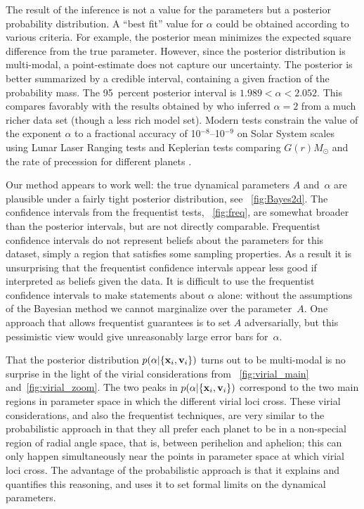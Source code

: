 The result of the inference is not a value for the parameters but a
posterior probability distribution.  A ``best fit'' value for $\alpha$
could be obtained according to various criteria. For example, the
posterior mean minimizes the expected square difference from the true
parameter. However, since the posterior distribution is multi-modal, a
point-estimate does not capture our uncertainty.  The posterior is
better summarized by a credible interval, containing a given fraction
of the probability mass. The 95~percent posterior interval is $1.989 <
\alpha < 2.052$. This compares favorably with the results obtained by
\citet{Newton} who inferred $\alpha = 2$ from a much richer data set
(though a less rich model set). Modern tests constrain the value of
the exponent $\alpha$ to a fractional accuracy of 10$^{-8}$--10$^{-9}$
on Solar System scales \citep{adelberger,fischbach} using Lunar Laser
Ranging tests \citep{williams} and Keplerian tests comparing $G(r)
M_{\odot}$ and the rate of precession for different planets
\citep{talmadge}.

Our method appears to work well: the true dynamical parameters $A$
and~$\alpha$ are plausible under a fairly tight posterior
distribution, see \figurename~\ref{fig:Bayes2d}. The confidence
intervals from the frequentist tests, \figurename~\ref{fig:freq}, are
somewhat broader than the posterior intervals, but are not directly
comparable. Frequentist confidence intervals do not represent beliefs
about the parameters for this dataset, simply a region that satisfies
some sampling properties. As a result it is unsurprising that the
frequentist confidence intervals appear less good if interpreted as
beliefs given the data. It is difficult to use the frequentist
confidence intervals to make statements about $\alpha$ alone: without
the assumptions of the Bayesian method we cannot marginalize over the
parameter~$A$. One approach that allows frequentist guarantees is to
set $A$ adversarially, but this pessimistic view would give
unreasonably large error bars for~$\alpha$.

That the posterior distribution $p(\alpha|\{\boldsymbol{\mathbf{x}}_i,\boldsymbol{\mathbf{v}}_i\})$ turns out to be
multi-modal is no surprise in the light of the virial considerations
from \figurenames~\ref{fig:virial_main} and~\ref{fig:virial_zoom}. The
two peaks in $p(\alpha|\{\boldsymbol{\mathbf{x}}_i,\boldsymbol{\mathbf{v}}_i\})$ correspond to the two main
regions in parameter space in which the different virial loci
cross. These virial considerations, and also the frequentist
techniques, are very similar to the probabilistic approach in that
they all prefer each planet to be in a non-special region of radial
angle space, that is, between perihelion and aphelion; this can only
happen simultaneously near the points in parameter space at which
virial loci cross.  The advantage of the probabilistic approach is
that it explains and quantifies this reasoning, and uses it to set
formal limits on the dynamical parameters.

